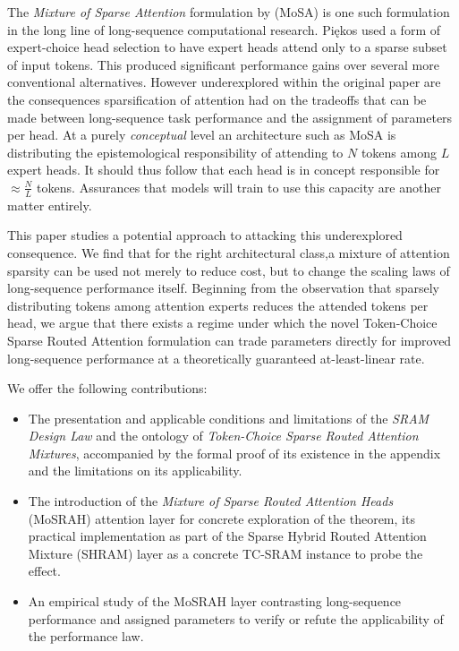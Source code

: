 \documentclass[11pt]{article}
\begin{document}
The \emph{Mixture of Sparse Attention} formulation by \citet{piekos2025mosa} (MoSA) is one such formulation in the long line of long-sequence computational research. Pi\k{e}kos used a form of expert-choice head selection to have expert heads attend only to a sparse subset of input tokens. This produced significant performance gains over several more conventional alternatives. However underexplored within the original paper are the consequences sparsification of attention had on the tradeoffs that can be made between long-sequence task performance and the assignment of parameters per head. At a purely \emph{conceptual} level an architecture such as MoSA is distributing the epistemological responsibility of attending to $N$ tokens among $L$ expert heads. It should thus follow that each head is in concept responsible for $\approx \frac{N}{L}$ tokens. Assurances that models will train to use this capacity are another matter entirely.

This paper studies a potential approach to attacking this underexplored consequence. We find that for the right architectural class,a mixture of attention sparsity can be used not merely to reduce cost, but to change the scaling laws of long-sequence performance itself. Beginning from the observation that sparsely distributing tokens among attention experts reduces the attended tokens per head, we argue that there exists a regime under which the novel Token-Choice Sparse Routed Attention formulation can trade parameters directly for improved long-sequence performance at a theoretically guaranteed at-least-linear rate.

We offer the following contributions:

\begin{itemize}
    \item The presentation and applicable conditions and limitations of the \emph{SRAM Design Law} and the ontology of \emph{Token-Choice Sparse Routed Attention Mixtures}, accompanied by the formal proof of its existence in the appendix and the limitations on its applicability.
    \item The introduction of the \emph{Mixture of Sparse Routed Attention Heads} (MoSRAH) attention layer for concrete exploration of the theorem, its practical implementation as part of the Sparse Hybrid Routed Attention Mixture (SHRAM) layer as a concrete TC-SRAM instance to probe the effect.
    \item An empirical study of the MoSRAH layer contrasting long-sequence performance and assigned parameters to verify or refute the applicability of the performance law.
\end{itemize}
\end{document}
